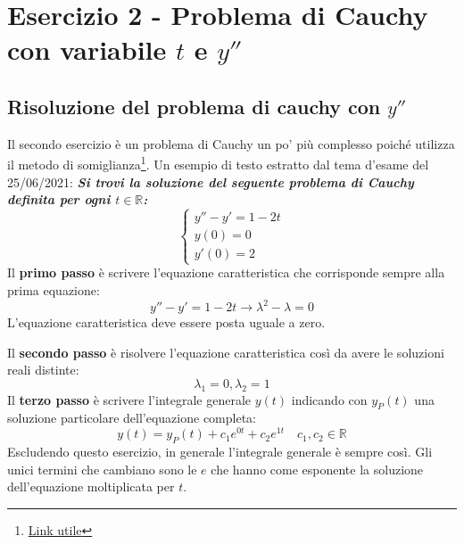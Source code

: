 \documentclass[a4paper]{article}
\begin{document}
	\section{Esercizio 2 - Problema di Cauchy con variabile $t$ e $y''$}

	\subsection{Risoluzione del problema di cauchy con $y''$}

	Il secondo esercizio è un problema di Cauchy un po' più complesso poiché utilizza il metodo di somiglianza\footnote{\href{https://youtu.be/Ij2V7cj_lh8}{Link utile}}. Un esempio di testo estratto dal tema d'esame del 25/06/2021: \textcolor{Green4}{\textbf{\emph{Si trovi la soluzione del seguente problema di Cauchy definita per ogni $t \in \mathbb{R}$:}}}
	\begin{equation*}
		\begin{cases}
			y'' - y' = 1 - 2t \\
			y\left(0\right) = 0 \\
			y'\left(0\right) = 2
		\end{cases}
	\end{equation*}
	Il \textbf{primo passo} è scrivere l'equazione caratteristica che corrisponde sempre alla prima equazione:
	\begin{equation*}
		y'' - y' = 1 - 2t \longrightarrow \lambda^{2} - \lambda = 0
	\end{equation*}
	L'equazione caratteristica deve essere posta uguale a zero.\newline

	\noindent
	Il \textbf{secondo passo} è risolvere l'equazione caratteristica così da avere le soluzioni reali distinte:
	\begin{equation*}
		\lambda_{1} = 0, \lambda_{2} = 1
	\end{equation*}
	Il \textbf{terzo passo} è scrivere l'integrale generale $y\left(t\right)$ indicando con $y_{P}\left(t\right)$ una soluzione particolare dell'equazione completa:
	\begin{equation*}
		y\left(t\right) = y_{P}\left(t\right) + c_{1}e^{0t} + c_{2}e^{1t} \hspace{1em} c_{1}, c_{2} \in \mathbb{R}
	\end{equation*}
	Escludendo questo esercizio, in generale l'integrale generale è sempre così. Gli unici termini che cambiano sono le $e$ che hanno come esponente la soluzione dell'equazione moltiplicata per $t$.\newline
\end{document}
